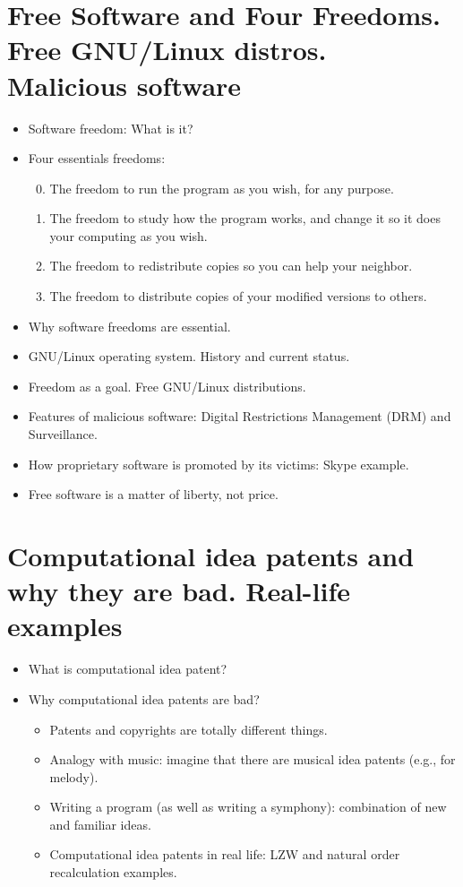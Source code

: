 \documentclass[twoside,openright]{report}
\begin{document}
\section[Free Software and Four Freedoms. Free GNU/Linux distros. Malicious software]{Free Software and Four Freedoms.\\ Free GNU/Linux distros.\\ Malicious software}
\begin{itemize}
 \item    Software freedom: What is it?
 \item    Four essentials freedoms:
\begin{enumerate}
\setcounter{enumi}{-1}
 \item        The freedom to run the program as you wish, for any purpose.
 \item        The freedom to study how the program works, and change it so it does your computing as you wish.
 \item        The freedom to redistribute copies so you can help your neighbor.
 \item        The freedom to distribute copies of your modified versions to others.
\end{enumerate}
 \item    Why software freedoms are essential.
 \item    GNU/Linux operating system. History and current status.
 \item    Freedom as a goal. Free GNU/Linux distributions.
 \item    Features of malicious software: Digital Restrictions Management (DRM) and Surveillance.
 \item    How proprietary software is promoted by its victims: Skype example.
 \item    Free software is a matter of liberty, not price.
\end{itemize}


\section{Computational idea patents and why they are bad. Real-life examples}
\begin{itemize}
 \item    What is computational idea patent?
 \item    Why computational idea patents are bad?
\begin{itemize}
 \item        Patents and copyrights are totally different things.
 \item        Analogy with music: imagine that there are musical idea patents (e.g., for melody).
 \item        Writing a program (as well as writing a symphony): combination of new and familiar ideas.
 \item        Computational idea patents in real life: LZW and natural order recalculation examples.
\end{itemize}
\end{itemize}
\end{document}
